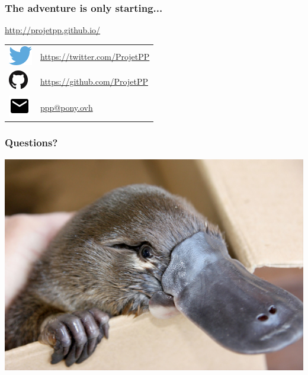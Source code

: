 \newlength{\logosize}
\setlength{\logosize}{12pt}
\begin{frame}
    \frametitle{The adventure is only starting...}
    \alert{\url{http://projetpp.github.io/}}

    \begin{tabular}{ll}
        \includegraphics[width=\logosize]{Twitter_logo_blue.png} & \href{https://twitter.com/ProjetPP}{https://twitter.com/ProjetPP}\\
        \includegraphics[width=\logosize]{GitHub-Mark-32px.png} &  \href{https://github.com/ProjetPP}{https://github.com/ProjetPP}\\
        \includegraphics[width=\logosize]{ic_email_black_18dp.png} & \href{mailto:ppp@pony.ovh}{ppp@pony.ovh}\\
    \end{tabular}
\end{frame}


\begin{frame}
    \frametitle{Questions?}
    \includegraphics[width=\linewidth]{figures/platypusLg.jpg}
\end{frame}
